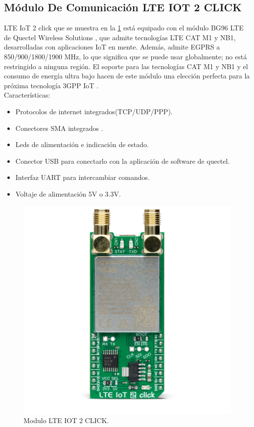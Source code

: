 \subsection{Módulo De Comunicación LTE IOT 2 CLICK}
\label{subsec:ejemplo}
LTE IoT 2 click que se muestra en la \ref{fig:modulo LTE IOT} está equipado con el módulo BG96 LTE de Quectel Wireless Solutions , que admite tecnologías LTE CAT M1 y NB1, desarrolladas con aplicaciones IoT en mente. Además, admite EGPRS a 850/900/1800/1900 MHz, lo que significa que se puede usar globalmente; no está restringido a ninguna región. El soporte para las tecnologías CAT M1 y NB1 y el consumo de energía ultra bajo hacen de este módulo una elección perfecta para la próxima tecnología 3GPP IoT \citep{MonuloLTE-IOT}.
\\Características:
\begin{itemize}
	\item Protocolos de internet integrados(TCP/UDP/PPP).
	\item Conectores SMA integrados .
	\item Leds de alimentación e indicación de estado.
	\item Conector USB para conectarlo con la aplicación de software de quectel.
	\item Interfaz UART para  intercambiar comandos. 
	\item Voltaje de alimentación 5V o 3.3V.

\end{itemize}


\begin{figure}[htbp]
	\centering
	\includegraphics[width=.4\textwidth]{./Figures/moduloBG96.jpg}
	\caption{Modulo LTE IOT 2 CLICK.}
	\label{fig:modulo LTE IOT}
\end{figure}

